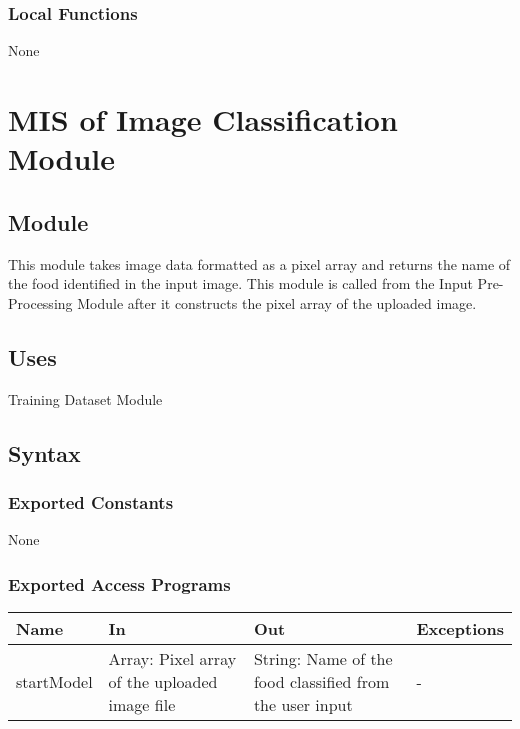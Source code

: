 \documentclass[12pt, titlepage]{article}
\begin{document}

\subsubsection{Local Functions}

None
 

\newpage

\section{MIS of Image Classification Module} \label{Module}

\subsection{Module}

This module takes image data formatted as a pixel array and returns the name of the food identified in the input image. This module is called from the Input Pre-Processing Module after it constructs the pixel array of the uploaded image.

\subsection{Uses}

Training Dataset Module

\subsection{Syntax}

\subsubsection{Exported Constants}

None

\subsubsection{Exported Access Programs}

\begin{center}
\begin{tabular}{p{2cm} p{4cm} p{4cm} p{2cm}}
\hline
\textbf{Name} & \textbf{In} & \textbf{Out} & \textbf{Exceptions} \\
\hline
startModel & Array: Pixel array of the uploaded image file & String: Name of the
food classified from
the user input & - \\
\hline
\end{tabular}
\end{center}
\end{document}
